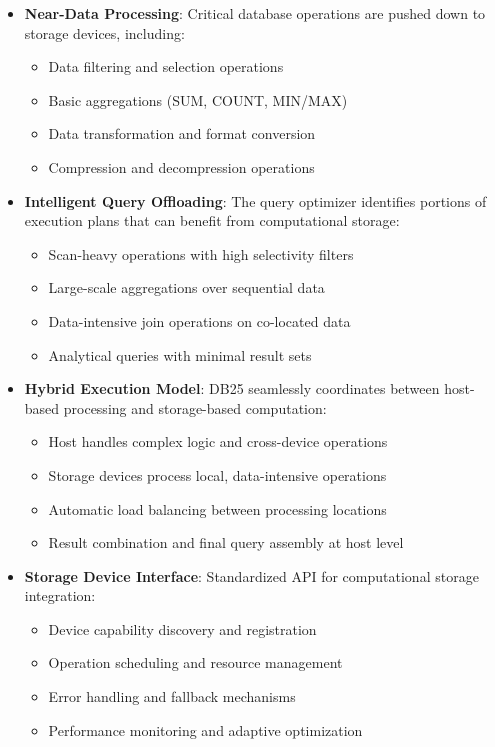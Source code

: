 \documentclass[12pt,a4paper]{article}
\begin{document}
    \begin{itemize}
        \item \textbf{Near-Data Processing}: Critical database operations are pushed down to storage devices, including:
        \begin{itemize}
            \item Data filtering and selection operations
            \item Basic aggregations (SUM, COUNT, MIN/MAX)
            \item Data transformation and format conversion
            \item Compression and decompression operations
        \end{itemize}
        
        \item \textbf{Intelligent Query Offloading}: The query optimizer identifies portions of execution plans that can benefit from computational storage:
        \begin{itemize}
            \item Scan-heavy operations with high selectivity filters
            \item Large-scale aggregations over sequential data
            \item Data-intensive join operations on co-located data
            \item Analytical queries with minimal result sets
        \end{itemize}
        
        \item \textbf{Hybrid Execution Model}: DB25 seamlessly coordinates between host-based processing and storage-based computation:
        \begin{itemize}
            \item Host handles complex logic and cross-device operations
            \item Storage devices process local, data-intensive operations
            \item Automatic load balancing between processing locations
            \item Result combination and final query assembly at host level
        \end{itemize}
        
        \item \textbf{Storage Device Interface}: Standardized API for computational storage integration:
        \begin{itemize}
            \item Device capability discovery and registration
            \item Operation scheduling and resource management
            \item Error handling and fallback mechanisms
            \item Performance monitoring and adaptive optimization
        \end{itemize}
    \end{itemize}
\end{document}
